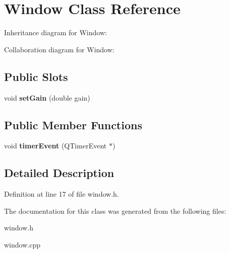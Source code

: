 \hypertarget{classWindow}{}\section{Window Class Reference}
\label{classWindow}


Inheritance diagram for Window\+:


Collaboration diagram for Window\+:
\subsection*{Public Slots}
\begin{DoxyCompactItemize}
\item 
\mbox{\label{classWindow_a06531ce47a4206b3dbef30587e768b29}} 
void {\bfseries set\+Gain} (double gain)
\end{DoxyCompactItemize}
\subsection*{Public Member Functions}
\begin{DoxyCompactItemize}
\item 
\mbox{\label{classWindow_a3656e486c467d9d7c7933812fb4b8f57}} 
void {\bfseries timer\+Event} (Q\+Timer\+Event $\ast$)
\end{DoxyCompactItemize}


\subsection{Detailed Description}


Definition at line 17 of file window.\+h.



The documentation for this class was generated from the following files\+:\begin{DoxyCompactItemize}
\item 
window.\+h\item 
window.\+cpp\end{DoxyCompactItemize}
